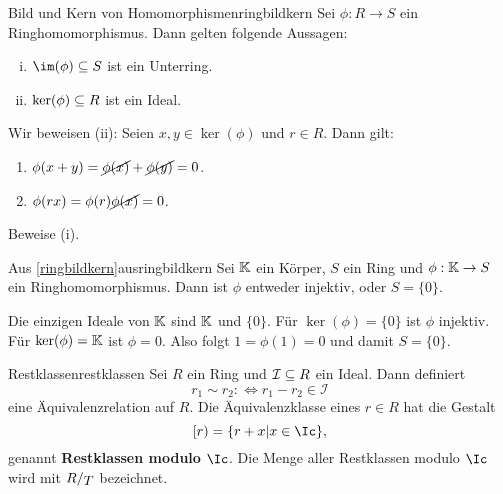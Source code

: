 \begin{satz}{Bild und Kern von Homomorphismen}{ringbildkern}
Sei $\phi: R \to S$ ein Ringhomomorphismus. Dann gelten folgende Aussagen:
\begin{enumerate}[(i)]
\item $\im (\phi) \sub S$ ist ein Unterring.
\item $\ker (\phi) \subseteq R$ ist ein Ideal.
\end{enumerate}
\end{satz}
\begin{beweis}
Wir beweisen (ii): Seien $x,y \in \ker (\phi)$ und $r \in R$. Dann gilt:
\begin{enumerate}
\item $\phi(x+y) = \cancel{\phi(x)} + \cancel{\phi(y)} = 0$.
\item $\phi(rx) = \phi(r) \cancel{\phi(x)} = 0$.
\end{enumerate}
\end{beweis}
\begin{übung}
Beweise (i).
\end{übung}
\begin{korollar}{Aus \ref{ringbildkern}}{ausringbildkern}
Sei $\mathbb{K}$ ein Körper, $S$ ein Ring und $\phi: \mathbb{K} \to S$ ein Ringhomomorphismus. Dann ist $\phi$ entweder injektiv, oder $S=\{0\}$.
\end{korollar}
\begin{beweis}
Die einzigen Ideale von $\mathbb{K}$ sind $\mathbb{K}$ und $\{0\}$. Für $\ker (\phi) = \{0\}$ ist $\phi$ injektiv. Für $\ker (\phi) = \mathbb{K}$ ist $\phi = 0$. Also folgt $1 = \phi(1) = 0$ und damit $S=\{0\}$.
\end{beweis}
\begin{definition}{Restklassen}{restklassen}
Sei $R$ ein Ring und $\mathcal{I} \subseteq R$ ein Ideal. Dann definiert
\begin{equation}
r_1 \sim r_2 : \iff r_1 - r_2 \in \mathcal{I}
\end{equation}
eine Äquivalenzrelation auf $R$. Die Äquivalenzklasse eines $r \in R$ hat die Gestalt
\begin{equation}
[r) = \{r+x|x \in \Ic \},
\end{equation}
genannt \textbf{Restklassen modulo} $\Ic$. Die Menge aller Restklassen modulo $\Ic$ wird mit $\quotient{R}{T}$ bezeichnet.
\end{definition}
